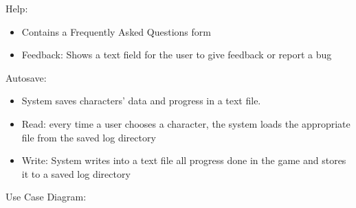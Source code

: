 \documentclass[12pt]{report}
\renewcommand{\_}{\kern-1.5pt\textunderscore\kern-1.5pt}
\begin{document}
\vspace{\baselineskip}
Help:\par

\begin{itemize}
	\item Contains a Frequently Asked Questions form
\end{itemize}\par

\begin{itemize}
	\item Feedback: Shows a text field for the user to give feedback or report a bug
\end{itemize}\par


\vspace{\baselineskip}
Autosave:\par

\begin{itemize}
	\item System saves characters’ data and progress in a text file.\par

	\item Read: every time a user chooses a character, the system loads the appropriate file from the saved log directory\par

	\item Write: System writes into a text file all progress done in the game and stores it to a saved log directory
\end{itemize}\par


\newpage
{\fontsize{14pt}{16.8pt}\selectfont Use Case Diagram:\par}\par



\end{document}
